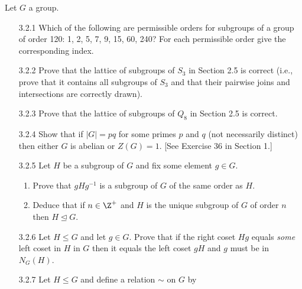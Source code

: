 Let $G$ a group.

\begin{enumerate}
   \item[3.2.1]   Which of the following are permissible orders for subgroups of
                  a group of order 120: 1, 2, 5, 7, 9, 15, 60, 240? For each
                  permissible order give the corresponding index.
   \item[3.2.2]   Prove that the lattice of subgroups of $S_3$ in Section 2.5 is
                  correct (i.e., prove that it contains all subgroups of $S_3$
                  and that their pairwise joins and intersections are correctly  
                  drawn).
   \item[3.2.3]   Prove that the lattice of subgroups of $Q_8$ in Section 2.5 is
                  correct.
   \item[3.2.4]   Show that if $|G| = pq$ for some primes $p$ and $q$ (not
                  necessarily distinct) then either $G$ is abelian or
                  $Z(G) = 1$. [See Exercise 36 in Section 1.]
   \item[3.2.5]   Let $H$ be a subgroup of $G$ and fix some element $g \in G$.
                  \begin{enumerate}
                     \item Prove that $gHg^{-1}$ is a subgroup of $G$ of the
                           same order as $H$.
                     \item Deduce that if $n \in \Z^+$ and $H$ is the unique
                           subgroup of $G$ of order $n$ then
                           $H \trianglelefteq G$.
                  \end{enumerate}
   \item[3.2.6]   Let $H \le G$ and let $g \in G$. Prove that if the right coset
                  $Hg$ equals \textit{some} left coset in $H$ in $G$ then it
                  equals the left coset $gH$ and $g$ must be in $N_G(H)$.
   \item[3.2.7]   Let $H \le G$ and define a relation $\sim$ on $G$ by

\end{enumerate}
